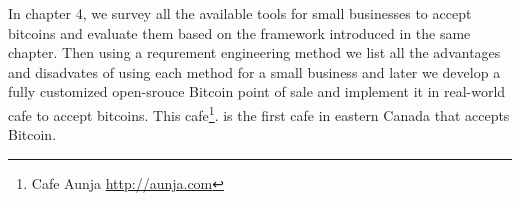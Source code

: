 In chapter 4, we survey all the available tools for small businesses to accept bitcoins and evaluate them based on the framework introduced in the same chapter. Then using a requrement engineering method we list all the advantages and disadvates of using each method for a small business and later we develop a fully customized open-srouce Bitcoin point of sale and implement it in real-world cafe to accept bitcoins. This cafe\footnote{ Cafe Aunja \url{http://aunja.com}}. is the first cafe in eastern Canada that accepts Bitcoin.

